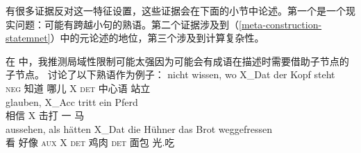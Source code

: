 有很多证据反对这一特征设置，这些证据会在下面的小节中论述。第一个是一个现实问题：可能有跨越小句的熟语。第二个证据涉及到（\ref{meta-construction-statemnet}）中的元论述的地位，第三个涉及到计算复杂性。


在 中，我推测局域性限制可能太强因为可能会有成语在描述时需要借助子节点的子节点。 讨论了以下熟语作为例子：
\eal
\label{ex-idiom-non-nominative-external}
\ex 
\gll nicht wissen, wo    X\_Dat der Kopf steht\\
     \textsc{neg}   知道   哪儿 X   \textsc{det} 中心语 站立\\
\ex\label{mich-tritt-ein-Pferd}
\gll glauben, X\_Acc tritt ein Pferd\\
     相信  X     击打 一 马\\
\ex 
\gll aussehen, als hätten X\_Dat die Hühner das Brot weggefressen\\
     看        好像 \textsc{aux} X   \textsc{det} 鸡肉  \textsc{det} 面包 光.吃\\
\ex
\label{ex-look-as-if-butter}

